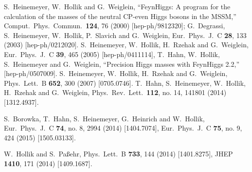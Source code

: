 \documentclass[12pt]{article}
\begin{document}
\begin{thebibliography}{999}
S.~Heinemeyer, W.~Hollik and G.~Weiglein,
  ``FeynHiggs: A program for the calculation of the masses of the neutral
  CP-even Higgs bosons in the MSSM,''
  Comput.\ Phys.\ Commun.\  {\bf 124}, 76 (2000)
  [hep-ph/9812320];
G.~Degrassi, S.~Heinemeyer, W.~Hollik, P.~Slavich and G.~Weiglein,
  Eur.\ Phys.\ J.\ C {\bf 28}, 133 (2003)
  [hep-ph/0212020].
S.~Heinemeyer, W.~Hollik, H.~Rzehak and G.~Weiglein,
  Eur.\ Phys.\ J.\ C {\bf 39}, 465 (2005)
  [hep-ph/0411114],
T.~Hahn, W.~Hollik, S.~Heinemeyer and G.~Weiglein,
  ``Precision Higgs masses with FeynHiggs 2.2,''
  [hep-ph/0507009].
S.~Heinemeyer, W.~Hollik, H.~Rzehak and G.~Weiglein,
  Phys.\ Lett.\ B {\bf 652}, 300 (2007)
  [0705.0746].
T.~Hahn, S.~Heinemeyer, W.~Hollik, H.~Rzehak and G.~Weiglein,
  Phys.\ Rev.\ Lett.\  {\bf 112}, no. 14, 141801 (2014)
  [1312.4937].
    
  S.~Borowka, T.~Hahn, S.~Heinemeyer, G.~Heinrich and W.~Hollik,
  Eur.\ Phys.\ J.\ C {\bf 74}, no. 8, 2994 (2014)
  [1404.7074],
  Eur.\ Phys.\ J.\ C {\bf 75}, no. 9, 424 (2015)
  [1505.03133].

  W.~Hollik and S.~Pa{\ss}ehr,
  Phys.\ Lett.\ B {\bf 733}, 144 (2014)
  [1401.8275],
  JHEP {\bf 1410}, 171 (2014)
  [1409.1687].
      

\end{thebibliography}
\end{document}

